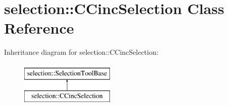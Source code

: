\hypertarget{classselection_1_1CCincSelection}{\section{selection\-:\-:C\-Cinc\-Selection Class Reference}
\label{classselection_1_1CCincSelection}
}
Inheritance diagram for selection\-:\-:C\-Cinc\-Selection\-:\begin{figure}[H]
\begin{center}
\leavevmode
\includegraphics[height=2.000000cm]{classselection_1_1CCincSelection}
\end{center}
\end{figure}
